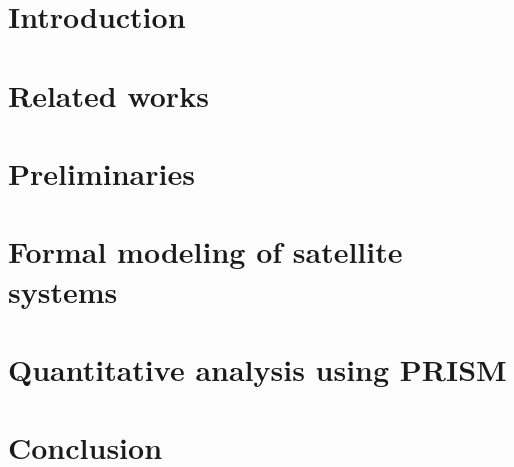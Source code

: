 \documentclass[conference]{IEEEtran}
\newcommand{\hermes} {Human-Centric Collaborative Architectural Decision-Making for Secure System Design}
\begin{document}
\section{Introduction}
\label{introduction}
\begin{sloppypar}

\end{sloppypar}

\section{Related works}
\label{works}
\begin{sloppypar}

\end{sloppypar}

\section{Preliminaries}
\label{preliminaries}
\begin{sloppypar}

\end{sloppypar}


\section{Formal modeling of satellite systems}
\label{sattelitemodel}
\begin{sloppypar}

\end{sloppypar}


\section{Quantitative analysis using PRISM}
\label{usecase}
\begin{sloppypar}

\end{sloppypar}

\section{Conclusion}
\label{conclusion}
\begin{sloppypar}

\end{sloppypar}

\newpage


{%
}

% 
\end{document}
